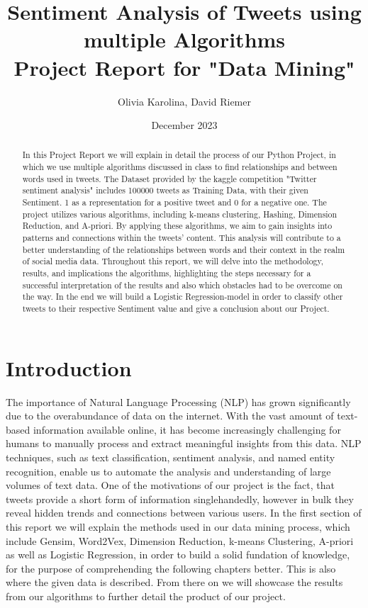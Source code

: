 \documentclass[11pt,a4paper]{article}
\title{Sentiment Analysis of Tweets using multiple Algorithms \\[0.5em] \large{Project Report for "Data Mining" \\[0.5em]} }
\author{Olivia Karolina, David Riemer}
\date{December 2023}
\begin{document}
\maketitle


\newpage
\begin{abstract}
In this Project Report we will explain in detail the process of our Python Project, in which we use multiple algorithms discussed in class to find relationships and between words used in tweets. The Dataset provided by the kaggle competition "Twitter sentiment analysis" includes 100000 tweets as Training Data, with their given Sentiment. 1 as a representation for a positive tweet and 0 for a negative one.
The project utilizes various algorithms, including k-means clustering, Hashing, Dimension Reduction, and A-priori. By applying these algorithms, we aim to gain insights into patterns and connections within the tweets' content. This analysis will contribute to a better understanding of the relationships between words and their context in the realm of social media data. 
Throughout this report, we will delve into the methodology, results, and implications the algorithms, highlighting the steps necessary for a successful interpretation of the results and also which obstacles had to be overcome on the way.
In the end we will build a Logistic Regression-model in order to classify other tweets to their respective Sentiment value and give a conclusion about our Project.
\end{abstract}
\newpage
\tableofcontents
\newpage
\section{Introduction}
The importance of Natural Language Processing (NLP) has grown significantly due to the overabundance of data on the internet. With the vast amount of text-based information available online, it has become increasingly challenging for humans to manually process and extract meaningful insights from this data. NLP techniques, such as text classification, sentiment analysis, and named entity recognition, enable us to automate the analysis and understanding of large volumes of text data. 
One of the motivations of our project is the fact, that tweets provide a short form of information singlehandedly, however in bulk they reveal hidden trends and connections between various users. 
In the first section of this report we will explain the methods used in our data mining process, which include Gensim, Word2Vex, Dimension Reduction, k-means Clustering, A-priori as well as Logistic Regression, in order to build a solid fundation of knowledge, for the purpose of comprehending the following chapters better. This is also where the given data is described. From there on we will showcase the results from our algorithms to further detail the product of our project.
\end{document}
